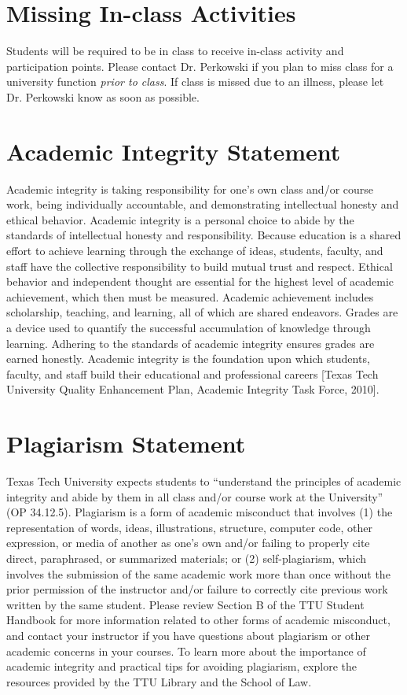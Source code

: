 \documentclass[12pt, notitlepage]{article}   	%
\begin{document}
{\section{Missing In-class Activities}
Students will be required to be in class to receive in-class activity and participation points. Please contact Dr. Perkowski if you plan to miss class for a university function \textit{prior to class}. If class is missed due to an illness, please let Dr. Perkowski know as soon as possible.

\section{Academic Integrity Statement}
Academic integrity is taking responsibility for one’s own class and/or course work, being individually accountable, and demonstrating intellectual honesty and ethical behavior. Academic integrity is a personal choice to abide by the standards of intellectual honesty and responsibility. Because education is a shared effort to achieve learning through the exchange of ideas, students, faculty, and staff have the collective responsibility to build mutual trust and respect. Ethical behavior and independent thought are essential for the highest level of academic achievement, which then must be measured. Academic achievement includes scholarship, teaching, and learning, all of which are shared endeavors. Grades are a device used to quantify the successful accumulation of knowledge through learning. Adhering to the standards of academic integrity ensures grades are earned honestly. Academic integrity is the foundation upon which students, faculty, and staff build their educational and professional careers [Texas Tech University Quality Enhancement Plan, Academic Integrity Task Force, 2010].

\section{Plagiarism Statement}
Texas Tech University expects students to “understand the principles of academic integrity and abide by them in all class and/or course work at the University” (OP 34.12.5). Plagiarism is a form of academic misconduct that involves (1) the representation of words,  ideas, illustrations, structure, computer code, other expression, or media of another as one's own and/or failing to properly cite direct, paraphrased, or summarized materials; or (2) self-plagiarism, which involves the submission of the same academic work more than once without the prior permission of the instructor and/or failure to correctly cite previous work written by the same student. Please review Section B of the TTU Student Handbook for more information related to other forms of academic misconduct, and contact your instructor if you have questions about plagiarism or other academic concerns in your courses. To learn more about the importance of academic integrity and practical tips for avoiding plagiarism, explore the resources provided by the TTU Library and the School of Law.

}
\end{document}
